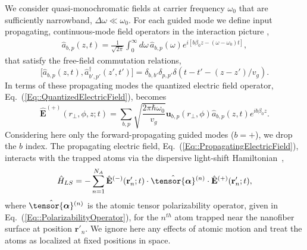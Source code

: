 \documentclass[preprint, aps,pra,onecolumn]{revtex4-1} %
\newcommand{\erf}[1]{Eq.~(\ref{#1})}
\newcommand{\poltens}{\hat{\tensor{\boldsymbol{\alpha}}}}
\begin{document}
We consider quasi-monochromatic fields at carrier frequency $\omega_0$ that are sufficiently narrowband, $\Delta \omega \ll \omega_0$. 
For each guided mode we define input propagating, continuous-mode field operators in the interaction picture \cite{gardiner_input_1985, blow_continuum_1990, le_kien_correlations_2008},
	\begin{align}
		\hat{a}_{b,p}(z,t) =\frac{1}{\sqrt{2 \pi}}  \int_0^{\infty}\!\!\!\!\! d \omega \, \hat{a}_{b,p}(\omega) e^{i[b \beta_0 z- (\omega-\omega_0) t ]}, 
	\end{align}
that satisfy the free-field commutation relations,
	\begin{equation} \label{Eq::InputOutputCommutation}
		\big[\hat{a}_{b,p}(z,t),\hat{a}^\dag_{b',p'}(z',t')\big]=\delta_{b,b'}\delta_{p,p'}  \delta(t-t'-(z-z')/v_g).
	\end{equation}
In terms of these propagating modes the quantized electric field operator, \erf{Eq::QuantizedElectricField}, becomes
	\begin{equation} \label{Eq::PropagatingElectricField}
		\hat{\mathbf{E}}^{(+)}(r\!_\perp,\phi,z;t) = \sum_{b,p} \sqrt{ \frac{2 \pi \hbar \omega_0}{ v_g} } \mathbf{u}_{b,p}(r\!_\perp,\phi) \hat{a}_{b,p}(z,t)  e^{i b \beta_0 z}.
	\end{equation}	
Considering here only the forward-propagating guided modes ($b=+$), we drop the $b$ index.  
The propagating electric field, \erf{Eq::PropagatingElectricField}, interacts with the trapped atoms via the dispersive light-shift Hamiltonian~\cite{deutsch_quantum_2010,kien_dynamical_2013,baragiola_open_2014},
	\begin{equation} \label{Eq::LightShiftHam}
		\hat{H}_{LS} = - \sum_{n=1}^{N_A} \hat{\mathbf{E}}^{(-)}(\mathbf{r}'_n ; t ) \cdot \poltens {}^{(n)} \cdot \hat{\mathbf{E}}^{(+)}(\mathbf{r}'_n ;t ),
	\end{equation}
where $\poltens {}^{(n)}$ is the atomic tensor polarizability operator, given in \erf{Eq::PolarizabilityOperator}, for the $n^{th}$ atom trapped near the nanofiber surface at position $\mathbf{r}'_n$.  We ignore here any effects of atomic motion and treat the atoms as localized at fixed positions in space.
\end{document}
